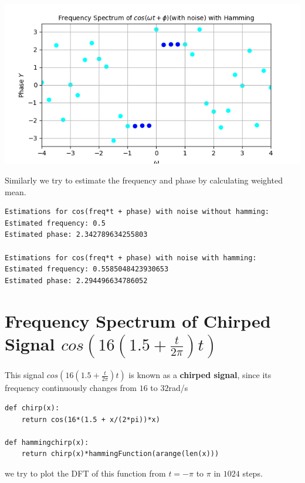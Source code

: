 \documentclass[12pt, a4paper]{report}
\begin{document}
\begin{center}
	\includegraphics[scale=0.8]{Figure_21.png} 
	\label{fig:rawdata}
\end{center}
Similarly we try to estimate the frequency and phase by calculating weighted mean.
\begin{verbatim}
Estimations for cos(freq*t + phase) with noise without hamming:
Estimated frequency: 0.5
Estimated phase: 2.342789634255803

Estimations for cos(freq*t + phase) with noise with hamming:
Estimated frequency: 0.5585048423930653
Estimated phase: 2.294496634786052
\end{verbatim}

\section*{Frequency Spectrum of Chirped Signal $cos(16(1.5+ \frac{t}{2\pi})t)$}
This signal $cos(16(1.5+ \frac{t}{2\pi})t)$ is known as a \textbf{chirped signal}, since its frequency continuously changes from $16$ to $32$rad/s
\begin{verbatim}
def chirp(x):
    return cos(16*(1.5 + x/(2*pi))*x)

def hammingchirp(x):
    return chirp(x)*hammingFunction(arange(len(x)))
\end{verbatim}
we try to plot the DFT of this function from $t = -\pi$ to $\pi$ in $1024$ steps.
\clearpage
\end{document}
